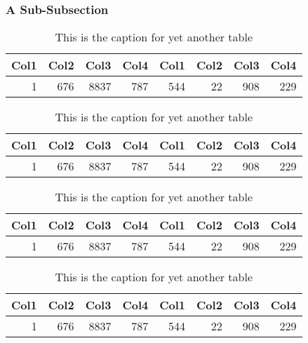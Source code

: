 \subsubsection{A Sub-Subsection}
    \lipsum[6-8]
    \begin{table}
        \centering
        \begin{tabular}{r r r r r r r r}
             Col1 & Col2 & Col3 & Col4 & Col1 & Col2 & Col3 & Col4 \\
             \hline
             1    & 676  & 8837 & 787  & 544  & 22   & 908  & 229  \\
             \hline
        \end{tabular}
        \captionsetup{width=3.9in}
        \caption{This is the caption for yet another table}
    \end{table}
    \begin{table}
        \centering
        \begin{tabular}{r r r r r r r r}
             Col1 & Col2 & Col3 & Col4 & Col1 & Col2 & Col3 & Col4 \\
             \hline
             1    & 676  & 8837 & 787  & 544  & 22   & 908  & 229  \\
             \hline
        \end{tabular}
        \captionsetup{width=3.9in}
        \caption{This is the caption for yet another table}
    \end{table}
    \begin{table}
        \centering
        \begin{tabular}{r r r r r r r r}
             Col1 & Col2 & Col3 & Col4 & Col1 & Col2 & Col3 & Col4 \\
             \hline
             1    & 676  & 8837 & 787  & 544  & 22   & 908  & 229  \\
             \hline
        \end{tabular}
        \captionsetup{width=3.9in}
        \caption{This is the caption for yet another table}
    \end{table}
    \begin{table}
        \centering
        \begin{tabular}{r r r r r r r r}
             Col1 & Col2 & Col3 & Col4 & Col1 & Col2 & Col3 & Col4 \\
             \hline
             1    & 676  & 8837 & 787  & 544  & 22   & 908  & 229  \\
             \hline
        \end{tabular}
        \captionsetup{width=3.9in}
        \caption{This is the caption for yet another table}
    \end{table}
